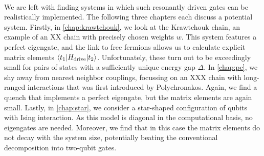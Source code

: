 \paragraph{}
We are left with finding systems in which such resonantly driven gates can be realistically implemented. The following three chapters each discuss a potential system. Firstly, in \cref{chap:krawtchouk}, we look at the Krawtchouk chain, an example of an XX chain with precisely chosen weights $w$. This system features a perfect eigengate, and the link to free fermions allows us to calculate explicit matrix elements $\langle t_1\rvert H_\text{drive} \lvert t_2\rangle$. Unfortunately, these turn out to be exceedingly small for pairs of states with a sufficiently unique energy gap $\Delta$. In \cref{chap:pc}, we shy away from nearest neighbor couplings, focussing on an XXX chain with long-ranged interactions that was first introduced by Polychronakos. Again, we find a quench that implements a perfect eigengate, but the matrix elements are again small. Lastly, in \cref{chap:star}, we consider a star-shaped configuration of qubits with Ising interaction. As this model is diagonal in the computational basis, no eigengates are needed. Moreover, we find that in this case the matrix elements do not decay with the system size, potentially beating the conventional decomposition into two-qubit gates. 
%


